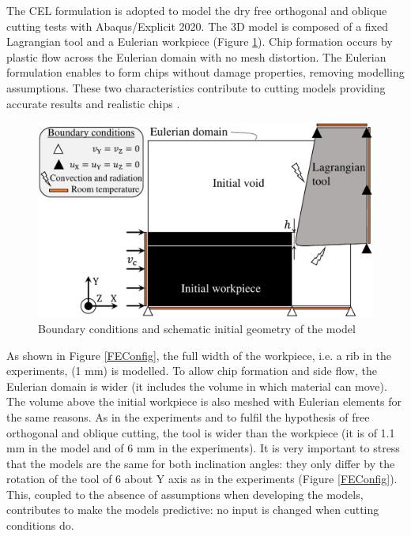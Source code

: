 \documentclass[preprint,12pt,times]{elsarticle}
\begin{document}
The CEL formulation is adopted to model the dry free orthogonal and oblique cutting tests with Abaqus/Explicit 2020. The 3D model is composed of a fixed Lagrangian tool and a Eulerian workpiece (Figure \ref{BC}). Chip formation occurs by plastic flow across the Eulerian domain with no mesh distortion. The Eulerian formulation enables to form chips without damage properties, removing modelling assumptions. These two characteristics contribute to cutting models providing accurate results and realistic chips \cite{ducobu_Application_2016}.

\begin{figure}[h]
\centering
\includegraphics[width = 140 mm]{Figures/BC} %
\caption{Boundary conditions and schematic initial geometry of the model}
\label{BC}
\end{figure}

As shown in Figure \ref{FEConfig}, the full width of the workpiece, i.e. a rib in the experiments, (1 mm) is modelled. To allow chip formation and side flow, the Eulerian domain is wider (it includes the volume in which material can move). The volume above the initial workpiece is also meshed with Eulerian elements for the same reasons. As in the experiments and to fulfil the hypothesis of free orthogonal and oblique cutting, the tool is wider than the workpiece (it is of 1.1 mm in the model and of 6 mm in the experiments). It is very important to stress that the models are the same for both inclination angles: they only differ by the rotation of the tool of 6\textdegree{} about Y axis as in the experiments (Figure \ref{FEConfig}). This, coupled to the absence of assumptions when developing the models, contributes to make the models predictive: no input is changed when cutting conditions do.
\end{document}
